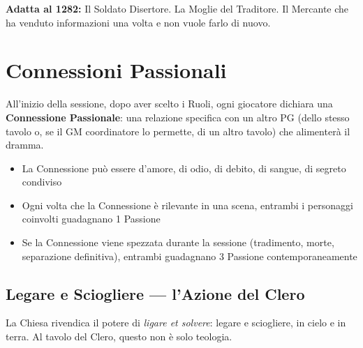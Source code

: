 \textbf{Adatta al 1282:} Il Soldato Disertore. La Moglie del
Traditore. Il Mercante che ha venduto informazioni una volta e
non vuole farlo di nuovo.

\secsep

\section{Connessioni Passionali}

All'inizio della sessione, dopo aver scelto i Ruoli, ogni giocatore
dichiara una \textbf{Connessione Passionale}: una relazione specifica
con un altro PG (dello stesso tavolo o, se il GM coordinatore lo
permette, di un altro tavolo) che alimenterà il dramma.

\begin{itemize}[nosep]
  \item La Connessione può essere d'amore, di odio, di debito,
    di sangue, di segreto condiviso
  \item Ogni volta che la Connessione è rilevante in una scena,
    entrambi i personaggi coinvolti guadagnano 1 Passione
  \item Se la Connessione viene spezzata durante la sessione
    (tradimento, morte, separazione definitiva), entrambi guadagnano
    3 Passione contemporaneamente
\end{itemize}



\subsection{Legare e Sciogliere — l'Azione del Clero}

La Chiesa rivendica il potere di \textit{ligare et solvere}: legare e
sciogliere, in cielo e in terra. Al tavolo del Clero, questo non è solo
teologia.

